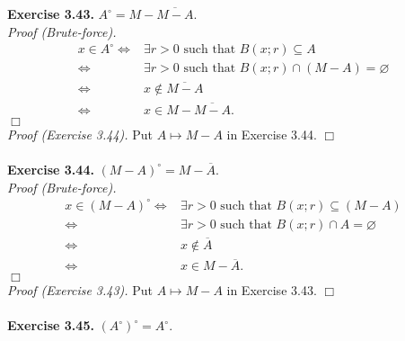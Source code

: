 \documentclass{article}
\begin{document}
\textbf{Exercise 3.43.}
\emph{$A^{\circ} = M - \overline{M - A}.$} \\

\emph{Proof (Brute-force).}
\begin{align*}
x \in A^{\circ}
\Longleftrightarrow&
\exists r > 0 \text{ such that } B(x;r) \subseteq A \\
\Longleftrightarrow&
\exists r > 0 \text{ such that } B(x;r) \cap (M - A) = \varnothing \\
\Longleftrightarrow&
x \not\in \overline{M - A} \\
\Longleftrightarrow&
x \in M - \overline{M - A}.
\end{align*}
$\Box$ \\

\emph{Proof (Exercise 3.44).}
Put $A \mapsto M-A$ in Exercise 3.44.
$\Box$ \\\\






\textbf{Exercise 3.44.}
\emph{$(M-A)^{\circ} = M - \overline{A}.$} \\

\emph{Proof (Brute-force).}
\begin{align*}
x \in (M-A)^{\circ}
\Longleftrightarrow&
\exists r > 0 \text{ such that } B(x;r) \subseteq (M - A) \\
\Longleftrightarrow&
\exists r > 0 \text{ such that } B(x;r) \cap A = \varnothing \\
\Longleftrightarrow&
x \not\in \overline{A} \\
\Longleftrightarrow&
x \in M - \overline{A}.
\end{align*}
$\Box$ \\

\emph{Proof (Exercise 3.43).}
Put $A \mapsto M-A$ in Exercise 3.43.
$\Box$ \\\\






\textbf{Exercise 3.45.}
\emph{$(A^{\circ})^{\circ} = A^{\circ}.$} \\
\end{document}
